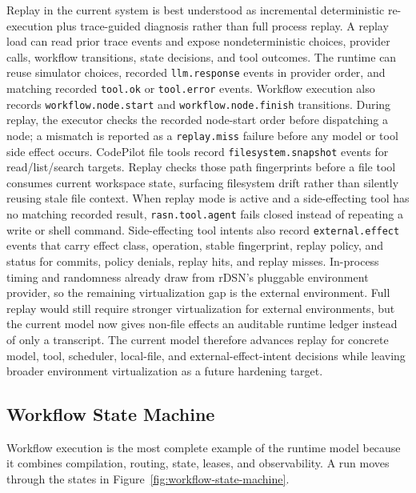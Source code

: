 \documentclass[manuscript,screen,review]{acmart}
\begin{document}
Replay in the current system is best understood as incremental deterministic
re-execution plus trace-guided diagnosis rather than full process replay. A
replay load can read prior trace events and expose nondeterministic choices,
provider calls, workflow transitions, state decisions, and tool outcomes. The
runtime can reuse simulator choices, recorded \texttt{llm.response} events in
provider order, and matching recorded \texttt{tool.ok} or \texttt{tool.error}
events. Workflow execution also records \texttt{workflow.node.start} and
\texttt{workflow.node.finish} transitions. During replay, the executor checks
the recorded node-start order before dispatching a node; a mismatch is reported
as a \texttt{replay.miss} failure before any model or tool side effect occurs.
CodePilot file tools record \texttt{filesystem.snapshot} events for
read/list/search targets. Replay checks those path fingerprints before a file
tool consumes current workspace state, surfacing filesystem drift rather than
silently reusing stale file context.
When replay mode is active and a side-effecting tool has no matching recorded
result, \texttt{rasn.tool.agent} fails closed instead of repeating a write or
shell command. Side-effecting tool intents also record
\texttt{external.effect} events that carry effect class, operation, stable
fingerprint, replay policy, and status for commits, policy denials, replay hits,
and replay misses. In-process timing and randomness already draw from rDSN's
pluggable environment provider, so the remaining virtualization gap is the
external environment. Full replay would still require stronger virtualization for
external environments, but the current model now gives non-file effects an
auditable runtime ledger instead of only a transcript. The current model
therefore advances replay for concrete model, tool, scheduler, local-file, and
external-effect-intent decisions while leaving broader environment virtualization
as a future hardening target.

\subsection{Workflow State Machine}

Workflow execution is the most complete example of the runtime model because it
combines compilation, routing, state, leases, and observability. A run moves
through the states in Figure~\ref{fig:workflow-state-machine}.
\end{document}

